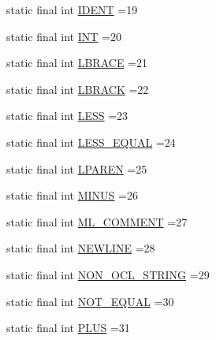 \begin{DoxyCompactItemize}
\item 
static final int \hyperlink{classorg_1_1tzi_1_1use_1_1parser_1_1generator_1_1_generator_lexer_a1b2d6a21204118ef186ca34389f9fd70}{I\-D\-E\-N\-T} =19
\item 
static final int \hyperlink{classorg_1_1tzi_1_1use_1_1parser_1_1generator_1_1_generator_lexer_aea0b73a60dee6882153e7a97ca1c5a8f}{I\-N\-T} =20
\item 
static final int \hyperlink{classorg_1_1tzi_1_1use_1_1parser_1_1generator_1_1_generator_lexer_a9e5cccb1d5e008308f9f47c9a26e463b}{L\-B\-R\-A\-C\-E} =21
\item 
static final int \hyperlink{classorg_1_1tzi_1_1use_1_1parser_1_1generator_1_1_generator_lexer_a04891707588b98d693693a593a5f88d7}{L\-B\-R\-A\-C\-K} =22
\item 
static final int \hyperlink{classorg_1_1tzi_1_1use_1_1parser_1_1generator_1_1_generator_lexer_a0edfa656999d7fb899f50d3bf0fff0ed}{L\-E\-S\-S} =23
\item 
static final int \hyperlink{classorg_1_1tzi_1_1use_1_1parser_1_1generator_1_1_generator_lexer_a0b4a5eef269772561fe1eb88b63c485c}{L\-E\-S\-S\-\_\-\-E\-Q\-U\-A\-L} =24
\item 
static final int \hyperlink{classorg_1_1tzi_1_1use_1_1parser_1_1generator_1_1_generator_lexer_aa7a71163331f0483dd1ea84550af1cff}{L\-P\-A\-R\-E\-N} =25
\item 
static final int \hyperlink{classorg_1_1tzi_1_1use_1_1parser_1_1generator_1_1_generator_lexer_ae9f981e8f3a643872892d5cc72e3988e}{M\-I\-N\-U\-S} =26
\item 
static final int \hyperlink{classorg_1_1tzi_1_1use_1_1parser_1_1generator_1_1_generator_lexer_a838b54f04b72d5fa0694b6810435a7b4}{M\-L\-\_\-\-C\-O\-M\-M\-E\-N\-T} =27
\item 
static final int \hyperlink{classorg_1_1tzi_1_1use_1_1parser_1_1generator_1_1_generator_lexer_abe7a362535a1b93f41d27ef0e94c4422}{N\-E\-W\-L\-I\-N\-E} =28
\item 
static final int \hyperlink{classorg_1_1tzi_1_1use_1_1parser_1_1generator_1_1_generator_lexer_a44399a37380e2bf4ed722fad517d7b4b}{N\-O\-N\-\_\-\-O\-C\-L\-\_\-\-S\-T\-R\-I\-N\-G} =29
\item 
static final int \hyperlink{classorg_1_1tzi_1_1use_1_1parser_1_1generator_1_1_generator_lexer_abbb34ffa2490be96b78b2ed59ef7bd09}{N\-O\-T\-\_\-\-E\-Q\-U\-A\-L} =30
\item 
static final int \hyperlink{classorg_1_1tzi_1_1use_1_1parser_1_1generator_1_1_generator_lexer_a871563f9ce6f370ae54ec23ecb950e77}{P\-L\-U\-S} =31

\end{DoxyCompactItemize}
